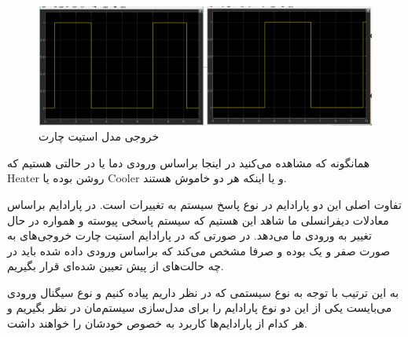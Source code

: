 \begin{figure}[h]
    \centering
    \includegraphics[width = \textwidth]{commons/image5.png}
    \caption{خروجی مدل استیت چارت}
\end{figure}

همانگونه که مشاهده می‌کنید در اینجا براساس ورودی دما یا در حالتی هستیم که 
Heater
روشن بوده یا
Cooler
و یا اینکه هر دو خاموش هستند.

تفاوت اصلی این دو پارادایم در نوع پاسخ سیستم به تغییرات است. در پارادایم براساس معادلات دیفرانسلی ما شاهد این هستیم که سیستم پاسخی پیوسته و همواره در حال تغییر به ورودی ما می‌دهد. در صورتی که در پارادایم استیت چارت خروجی‌های به صورت صفر و یک بوده و صرفا مشخص می‌کند که براساس ورودی داده شده باید در چه حالت‌های از پیش تعیین شده‌ای قرار بگیریم.

به این ترتیب با توجه به نوع سیستمی که در نظر داریم پیاده کنیم و نوع سیگنال ورودی می‌بایست یکی از این دو نوع پارادایم را برای مدل‌سازی سیستم‌مان در نظر بگیریم و هر کدام از پارادایم‌ها کاربرد به خصوص خودشان را خواهند داشت.